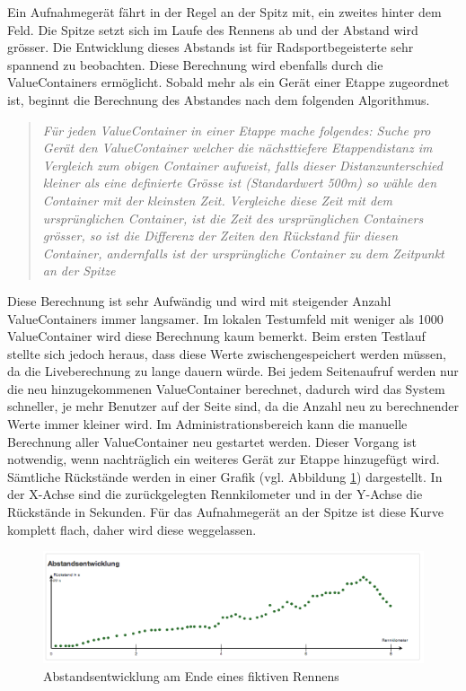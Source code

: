 Ein Aufnahmegerät fährt in der Regel an der Spitz mit, ein zweites hinter dem Feld. Die Spitze setzt sich im Laufe des Rennens ab und der Abstand wird grösser. Die Entwicklung dieses Abstands ist für Radsportbegeisterte sehr spannend zu beobachten. Diese Berechnung wird ebenfalls durch die ValueContainers ermöglicht. Sobald mehr als ein Gerät einer Etappe zugeordnet ist, beginnt die Berechnung des Abstandes nach dem folgenden Algorithmus.
\begin{quotation}
\textit{Für jeden ValueContainer in einer Etappe mache folgendes:
Suche pro Gerät den ValueContainer welcher die nächsttiefere Etappendistanz im Vergleich zum obigen Container aufweist, falls dieser Distanzunterschied kleiner als eine definierte Grösse ist (Standardwert 500m) so wähle den Container mit der kleinsten Zeit. Vergleiche diese Zeit mit dem ursprünglichen Container, ist die Zeit des ursprünglichen Containers grösser, so ist die Differenz der Zeiten den Rückstand für diesen Container, andernfalls ist der ursprüngliche Container zu dem Zeitpunkt an der Spitze}
\end{quotation}

Diese Berechnung ist sehr Aufwändig und wird mit steigender Anzahl ValueContainers immer langsamer. Im lokalen Testumfeld mit weniger als 1000 ValueContainer wird diese Berechnung kaum bemerkt. Beim ersten Testlauf stellte sich jedoch heraus, dass diese Werte zwischengespeichert werden müssen, da die Liveberechnung zu lange dauern würde. Bei jedem Seitenaufruf werden nur die neu hinzugekommenen ValueContainer berechnet, dadurch wird das System schneller, je mehr Benutzer auf der Seite sind, da die Anzahl neu zu berechnender Werte immer kleiner wird. Im Administrationsbereich kann die manuelle Berechnung aller ValueContainer neu gestartet werden. Dieser Vorgang ist notwendig, wenn nachträglich ein weiteres Gerät zur Etappe hinzugefügt wird.
\\

Sämtliche Rückstände werden in einer Grafik (vgl. Abbildung  \ref{fig:abstandsentwicklung2}) dargestellt. In der X-Achse sind die zurückgelegten Rennkilometer und in der Y-Achse die Rückstände in Sekunden. Für das Aufnahmegerät an der Spitze ist diese Kurve komplett flach, daher wird diese weggelassen.

\begin{figure}[H]
	\centering
	\includegraphics[width=130mm]{images/tourliveweb/abstandsentwicklung2.png}
	\caption{Abstandsentwicklung am Ende eines fiktiven Rennens}
	\label{fig:abstandsentwicklung2}
\end{figure}

